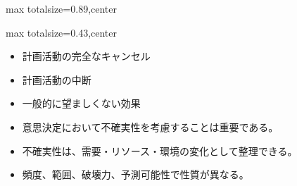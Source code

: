 \begin{minipage}[t]{0.58\textwidth}
\begin{adjustbox}{max totalsize={\textwidth}{0.89\textheight},center}
\begin{minipage}{\textwidth}
\end{minipage}
\end{adjustbox}
\end{minipage}


\clearpage
{}
\begin{minipage}[t]{0.405\textwidth}
\begin{adjustbox}{max totalsize={\textwidth}{0.43\textheight},center}
\begin{minipage}{\textwidth}\scriptsize
{}\begin{itemize}
\item 計画活動の完全なキャンセル
\item 計画活動の中断
\item 一般的に望ましくない効果
\item 意思決定において不確実性を考慮することは重要である。
\end{itemize}\begin{itemize}
\item 不確実性は、需要・リソース・環境の変化として整理できる。
\item 頻度、範囲、破壊力、予測可能性で性質が異なる。
\end{itemize}
\end{minipage}
\end{adjustbox}
\end{minipage}\hfill
